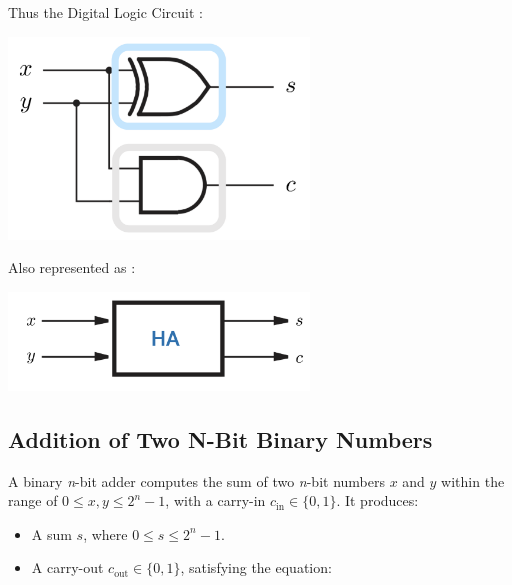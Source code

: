 \documentclass[12pt,openany, tikz,border=10pt]{book}
\begin{document}
Thus the Digital Logic Circuit : 
  \begin{center}
    \begin{minipage}[c]{0.60\textwidth} %
        \centering
        \includegraphics[width=0.60\textwidth]{circuits/7.1.3.png} %
    \end{minipage}

    \end{center}
Also represented as :
\begin{center}
    \begin{minipage}[c]{0.60\textwidth} %
        \centering
        \includegraphics[width=0.60\textwidth]{circuits/7.1.3_2.png} %
    \end{minipage}

\end{center}
\newpage

\subsection{Addition of Two N-Bit Binary Numbers}
A binary \textit{n}-bit adder computes the sum of two \textit{n}-bit numbers $x$ and $y$ within the range of $0 \leq x, y \leq 2^n - 1$, with a carry-in $c_{\text{in}} \in \{0, 1\}$. It produces:

\begin{itemize}
  \item[] A sum $s$, where $0 \leq s \leq 2^n - 1$.
  \item[] A carry-out $c_{\text{out}} \in \{0, 1\}$, satisfying the equation:
\end{itemize}
\end{document}
